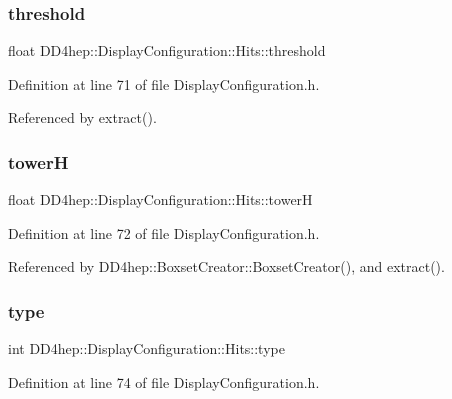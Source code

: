 \subsubsection{\texorpdfstring{threshold}{threshold}}
{\footnotesize\ttfamily float D\+D4hep\+::\+Display\+Configuration\+::\+Hits\+::threshold}



Definition at line 71 of file Display\+Configuration.\+h.



Referenced by extract().

\hypertarget{struct_d_d4hep_1_1_display_configuration_1_1_hits_a5c2fc0074ea8321a2cea82b3fc856584}{}\label{struct_d_d4hep_1_1_display_configuration_1_1_hits_a5c2fc0074ea8321a2cea82b3fc856584} 
\subsubsection{\texorpdfstring{towerH}{towerH}}
{\footnotesize\ttfamily float D\+D4hep\+::\+Display\+Configuration\+::\+Hits\+::towerH}



Definition at line 72 of file Display\+Configuration.\+h.



Referenced by D\+D4hep\+::\+Boxset\+Creator\+::\+Boxset\+Creator(), and extract().

\hypertarget{struct_d_d4hep_1_1_display_configuration_1_1_hits_ae126f3863288c51dc2633ba132e97bb0}{}\label{struct_d_d4hep_1_1_display_configuration_1_1_hits_ae126f3863288c51dc2633ba132e97bb0} 
\subsubsection{\texorpdfstring{type}{type}}
{\footnotesize\ttfamily int D\+D4hep\+::\+Display\+Configuration\+::\+Hits\+::type}



Definition at line 74 of file Display\+Configuration.\+h.



